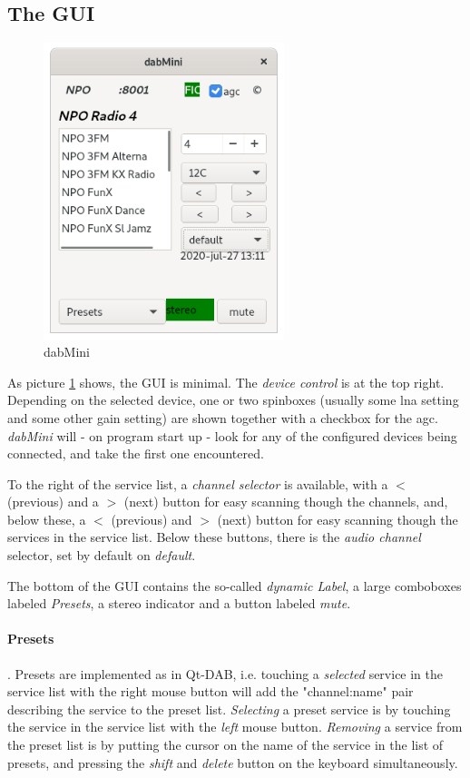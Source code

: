 \documentclass[12pt]{article}
\begin{document}
\subsection{The GUI}
\begin{figure}[htp]
\centering
\includegraphics[width=70mm]{dab-mini.png}
\caption{dabMini}
\label{figure:dab-Mini}
\end{figure}
\par
As picture \ref{figure:dab-Mini} shows, the GUI is minimal.
The {\em device control} is at the top right. Depending on the
selected device, one or two spinboxes (usually some lna setting
and some other gain setting) are shown together with a checkbox
for the agc. {\em dabMini} will - on program start up - look for
any of the configured devices being connected, and take the
first one encountered.
\par
To the right of the service list, a {\em channel selector} is available,
with a $<$ (previous) and a $>$ (next) button for easy scanning though
the channels, and, below these,
 a $<$ (previous) and $>$ (next) button for easy
scanning though the services in the service list.
Below these buttons, there is the {\em audio channel} selector,
set by default on {\em default}.
\par
The bottom of the GUI contains the so-called {\em dynamic Label},
a large comboboxes labeled {\em Presets}, a stereo indicator
and a button labeled {\em mute}.

\paragraph{Presets}.
Presets are implemented as in Qt-DAB,
i.e. touching a {\em selected} service in the service list with the
right mouse button will add the "channel:name" pair describing the
service to the preset list. {\em Selecting} a preset service is
by touching the service in the service list with the {\em left} mouse button.
{\em Removing} a service from the preset list is
by putting the cursor on the name of the service in the list of presets,
and pressing the {\em shift} and {\em delete} button on the keyboard
simultaneously.
\end{document}
